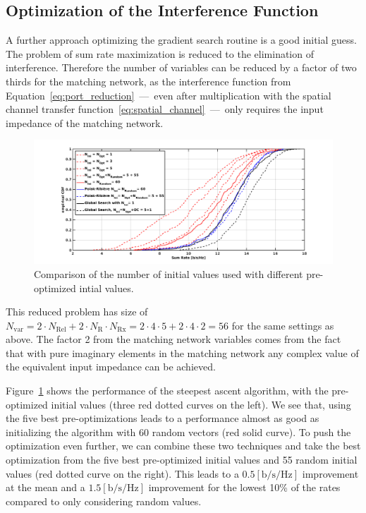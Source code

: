 \subsection{Optimization of the Interference Function}
\label{sec:preoptimization}
A further approach optimizing the gradient search routine is a good initial guess.
The problem of sum rate maximization is reduced to the elimination of interference.
Therefore the number of variables can be reduced by a factor of two thirds for the matching network, as the interference function from Equation~\eqref{eq:port_reduction}~---~even after multiplication with the spatial channel transfer function~\eqref{eq:spatial_channel}~---~only requires the input impedance of the matching network.
\begin{figure}[h]
\centering
  \includegraphics[width=\linewidth]{images/Inioptcomparison_edited.png}
\caption{Comparison of the number of initial values used with different pre-optimized intial values.}
\label{fig:iniopt_comp}
\end{figure}
This reduced problem has size of $N_\text{var} =  2\cdot N_\text{Rel}+2\cdot N_\text{R}\cdot N_\text{Rx} = 2\cdot 4\cdot 5 + 2\cdot 4\cdot 2 = 56$ for the same settings as above.
The factor 2 from the matching network variables comes from the fact that with pure imaginary elements in the matching network any complex value of the equivalent input impedance can be achieved.

Figure~\ref{fig:iniopt_comp} shows the performance of the steepest ascent algorithm, with the pre-optimized initial values (three red dotted curves on the left).
We see that, using the five best pre-optimizations leads to a performance almost as good as initializing the algorithm with 60 random vectors (red solid curve).
To push the optimization even further, we can combine these two techniques and take the best optimization from the five best pre-optimized initial values and 55 random initial values (red dotted curve on the right).
This leads to a $0.5 \left[\text{b/s/Hz}\right]$ improvement at the mean and a $1.5 \left[\text{b/s/Hz}\right]$ improvement for the lowest 10\% of the rates compared to only considering random values.

